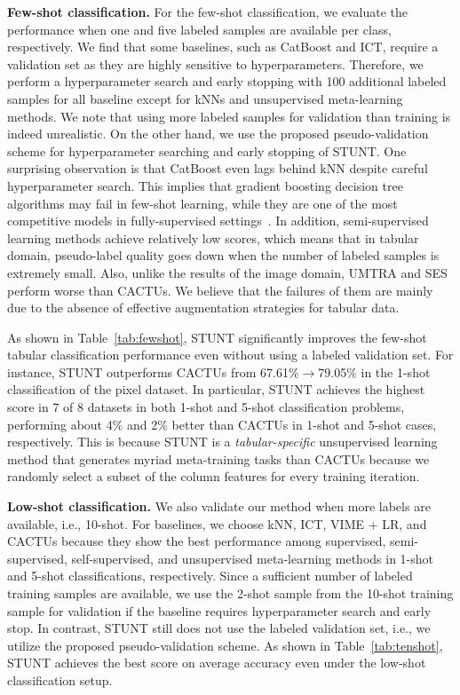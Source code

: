 \textbf{Few-shot classification.} For the few-shot classification, we evaluate the performance when one and five labeled samples are available per class, respectively. We find that some baselines, such as CatBoost and ICT, require a validation set as they are highly sensitive to hyperparameters. Therefore, we perform a hyperparameter search and early stopping with 100 additional labeled samples for all baseline except for kNNs and {unsupervised meta-learning methods}. We note that using more labeled samples for validation than training is indeed unrealistic. On the other hand, we use the proposed pseudo-validation scheme for hyperparameter searching and early stopping of STUNT. One surprising observation is that CatBoost even lags behind kNN despite careful hyperparameter search. This implies that gradient boosting decision tree algorithms may fail in few-shot learning, while they are one of the most competitive models in fully-supervised settings~\citep{shwartz2022tabular}. In addition, semi-supervised learning methods achieve relatively low scores, which means that in tabular domain, pseudo-label quality goes down when the number of labeled samples is extremely small. {Also, unlike the results of the image domain, UMTRA and SES perform worse than CACTUs. We believe that the failures of them are mainly due to the absence of effective augmentation strategies for tabular data.}

As shown in Table~\ref{tab:fewshot}, STUNT significantly improves the few-shot tabular classification performance even without using a labeled validation set. For instance, STUNT outperforms CACTUs from 67.61\%$\rightarrow$79.05\% in the 1-shot classification of the pixel dataset. In particular, STUNT achieves the highest score in 7 of 8 datasets in both 1-shot and 5-shot classification problems, performing about 4\% and 2\% better than CACTUs in 1-shot and 5-shot cases, respectively. This is because STUNT is a \emph{tabular-specific} unsupervised learning method that generates myriad meta-training tasks than CACTUs because we randomly select a subset of the column features for every training iteration.

\textbf{Low-shot classification.} We also validate our method when more labels are available, i.e., 10-shot. For baselines, we choose kNN, ICT, VIME + LR, and CACTUs because they show the best performance among supervised, semi-supervised, self-supervised, and unsupervised meta-learning methods in 1-shot and 5-shot classifications, respectively. Since a sufficient number of labeled training samples are available, we use the 2-shot sample from the 10-shot training sample for validation if the baseline requires hyperparameter search and early stop. In contrast, STUNT still does not use the labeled validation set, i.e., we utilize the proposed pseudo-validation scheme. As shown in Table~\ref{tab:tenshot}, STUNT achieves the best score on average accuracy even under the low-shot classification setup.


